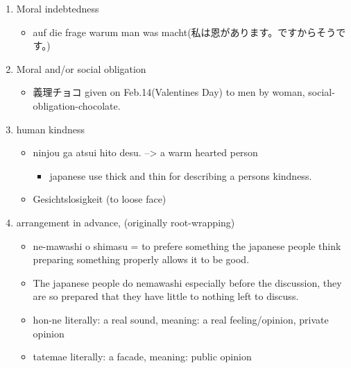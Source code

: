 \documentclass{article}
\begin{document}
\begin{enumerate}[itemsep=-6pt]
\begin{itemize}
\end{itemize}
\item {} Moral indebtedness	
\begin{itemize}%
\item auf die frage warum man was macht(私は恩があります。ですからそうです。) \\
\end{itemize}
\item {} Moral and/or social obligation
\begin{itemize}%
\item 義理チョコ given on Feb.14(Valentines Day) to men by woman, social-obligation-chocolate. \\
\end{itemize}
\item {} human kindness
\begin{itemize}%
\item ninjou ga atsui hito desu. --> a warm hearted person
\begin{itemize}%
\item japanese use thick and thin for describing a persons kindness.
\end{itemize}
\item {} Gesichtslosigkeit (to loose face)\\ %
\end{itemize}
\item {} arrangement in advance, (originally root-wrapping)
\begin{itemize}%
\item ne-mawashi o shimasu = to prefere something the japanese people think preparing something properly allows it to be good. 
\item The japanese people do nemawashi especially before the discussion, they are so prepared that they have little to nothing left to discuss.
\end{itemize}
\begin{itemize}%
\item hon-ne literally: a real sound, meaning: a real feeling/opinion, private opinion
\item tatemae literally: a facade, meaning: public opinion \\
\end{itemize}

\end{enumerate}
\end{document}
